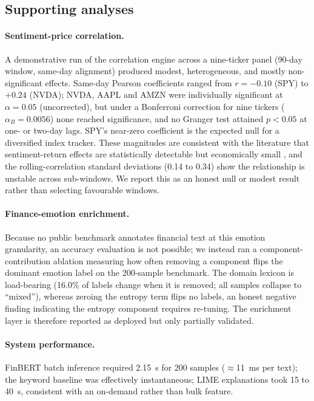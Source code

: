 \documentclass[12pt,a4paper]{article}
\begin{document}
\subsection{Supporting analyses}
\paragraph{Sentiment-price correlation.}
A demonstrative run of the correlation engine across a nine-ticker panel (90-day
window, same-day alignment) produced modest, heterogeneous, and mostly
non-significant effects. Same-day Pearson coefficients ranged from $r = -0.10$ (SPY)
to $+0.24$ (NVDA); NVDA, AAPL and AMZN were individually significant at
$\alpha = 0.05$ (uncorrected), but under a Bonferroni correction for nine tickers
($\alpha_B = 0.0056$) none reached significance, and no Granger test attained
$p < 0.05$ at one- or two-day lags. SPY's near-zero coefficient is the expected null
for a diversified index tracker. These magnitudes are consistent with the literature
that sentiment-return effects are statistically detectable but economically small
\citep{tetlock2007,kraaijeveld2020}, and the rolling-correlation standard deviations
(0.14 to 0.34) show the relationship is unstable across sub-windows. We report this
as an honest null or modest result rather than selecting favourable windows.

\paragraph{Finance-emotion enrichment.}
Because no public benchmark annotates financial text at this emotion granularity, an
accuracy evaluation is not possible; we instead ran a component-contribution
ablation measuring how often removing a component flips the dominant emotion label on
the 200-sample benchmark. The domain lexicon is load-bearing (16.0\% of labels change
when it is removed; all samples collapse to ``mixed''), whereas zeroing the entropy
term flips no labels, an honest negative finding indicating the entropy component
requires re-tuning. The enrichment layer is therefore reported as deployed but only
partially validated.

\paragraph{System performance.}
FinBERT batch inference required 2.15~s for 200 samples ($\approx$11~ms per text);
the keyword baseline was effectively instantaneous; LIME explanations took 15 to
40~s, consistent with an on-demand rather than bulk feature.
\end{document}
